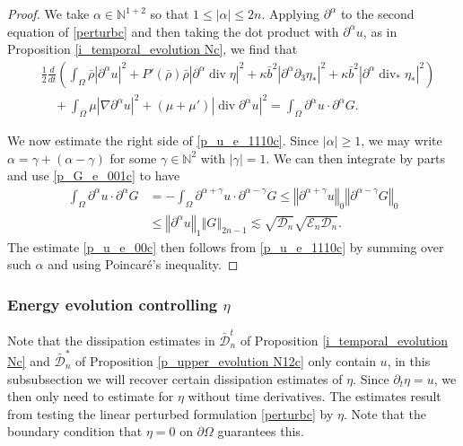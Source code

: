 \documentclass[a4paper,reqno,11pt]{amsart}
\numberwithin{equation}{section}
\providecommand{\abs}[1]{\left\vert#1\right\vert}
\providecommand{\norm}[1]{\left\Vert#1\right\Vert}
\providecommand{\sd}[1]{\mathcal{D}_{#1}}
\providecommand{\se}[1]{\mathcal{E}_{#1}}
\providecommand{\norm}[1]{\left\Vert#1\right\Vert}
\begin{document}
\begin{proof}
We take $\alpha\in \mathbb{N}^{1+2}$ so that $1\le |{\alpha}|\le 2n$. Applying ${\partial}^{\alpha} $ to the second equation of \eqref{perturbc} and then taking the dot product with ${\partial}^{\alpha} u$, as in Proposition \ref{i_temporal_evolution  Nc}, we find that
\begin{equation} \label{p_u_e_1110c}
\begin{split}
 &{\frac{1}{2}} \frac{d}{dt}\left(  \int_\Omega \bar \rho \abs{{\partial}^{\alpha}   u }^2  +P'(\bar\rho)\bar\rho \abs{ {\partial}^{\alpha} \operatorname{div}  \eta }^2+\kappa\bar b^2 \abs{{\partial}^{\alpha}{\partial}_3   \eta_\ast }^2 +\kappa\bar b^2 \abs{ {\partial}^{\alpha} \operatorname{div}_\ast  \eta_\ast }^2 \right)
  \\&\quad+ \int_\Omega  \mu  \abs{ \nabla{\partial}^{\alpha} u}^2 +(\mu+\mu') \abs{ \operatorname{div}{\partial}^{\alpha} u}^2
= \int_\Omega   {\partial}^{\alpha}  u  \cdot  {\partial}^{\alpha}  G  .
\end{split}
\end{equation}

We now estimate the right side of \eqref{p_u_e_1110c}. Since $\abs{\alpha}\ge 1$, we may write $\alpha = \gamma +(\alpha-\gamma)$ for some $\gamma \in \mathbb{N}^2$ with $\abs{\gamma}=1$. We can then integrate by parts and use \eqref{p_G_e_001c} to have
\begin{equation}\label{i_de_4c}
\begin{split}
  \int_\Omega     {\partial}^{\alpha}   u \cdot   {\partial}^{\alpha}  G   &=- \int_\Omega     {\partial}^{\alpha+\gamma}   u \cdot   {\partial}^{\alpha-\gamma}  G
 \le \norm{{\partial}^{\alpha+\gamma}   u}_{0}  \norm{ {\partial}^{\alpha-\gamma}   G  }_{0} \\&
\le \norm{{\partial}^{\alpha}   u}_{1}  \norm{    G  }_{2n-1 }
{\lesssim} \sqrt{ \sd{n} } \sqrt{ \se{n} \sd{n}} .
\end{split}
\end{equation}
The estimate \eqref{p_u_e_00c} then follows from \eqref{p_u_e_1110c} by summing over such $\alpha$ and using Poincar\'e's inequality.
\end{proof}

\subsubsection{Energy evolution controlling $\eta$}

Note that the dissipation estimates in $\bar{\mathcal{D}}_n^t$ of Proposition \ref{i_temporal_evolution  Nc} and $\bar{\mathcal{D}}_n^\ast$ of Proposition \ref{p_upper_evolution  N12c} only contain $u$, in this subsubsection we will recover certain dissipation estimates of $\eta$. Since ${\partial_t} \eta =u$, we then only need to estimate for $\eta$ without time derivatives. The estimates result from testing the linear perturbed formulation \eqref{perturbc} by $\eta$. Note that the boundary condition that $\eta=0$ on ${\partial}\Omega$ guarantees this.
\end{document}
